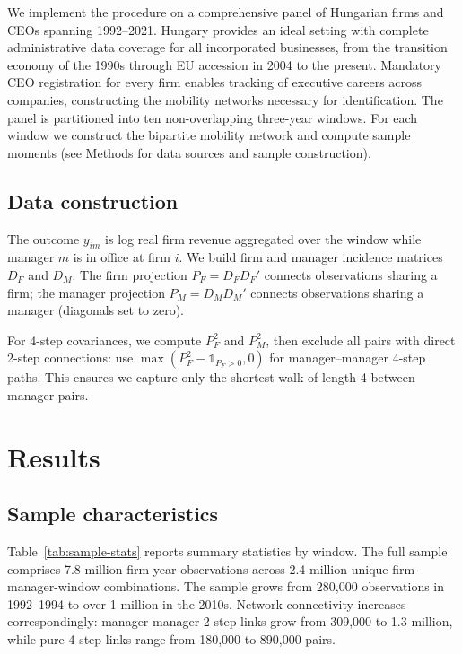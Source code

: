 \documentclass[9pt,twocolumn,twoside]{pnas-new}
\begin{document}
We implement the procedure on a comprehensive panel of Hungarian firms and CEOs spanning 1992--2021. Hungary provides an ideal setting with complete administrative data coverage for all incorporated businesses, from the transition economy of the 1990s through EU accession in 2004 to the present. Mandatory CEO registration for every firm enables tracking of executive careers across companies, constructing the mobility networks necessary for identification. The panel is partitioned into ten non-overlapping three-year windows. For each window we construct the bipartite mobility network and compute sample moments (see Methods for data sources and sample construction).

\subsection*{Data construction}
The outcome $y_{im}$ is log real firm revenue aggregated over the window while manager $m$ is in office at firm $i$. We build firm and manager incidence matrices $D_F$ and $D_M$. The firm projection $P_F = D_F D_F'$ connects observations sharing a firm; the manager projection $P_M = D_M D_M'$ connects observations sharing a manager (diagonals set to zero). 

For 4-step covariances, we compute $P_F^2$ and $P_M^2$, then exclude all pairs with direct 2-step connections: use $\max(P_F^2 - \mathbb{1}_{P_F>0}, 0)$ for manager--manager 4-step paths. This ensures we capture only the shortest walk of length 4 between manager pairs.

\section*{Results}

\subsection*{Sample characteristics}
Table~\ref{tab:sample-stats} reports summary statistics by window. The full sample comprises 7.8 million firm-year observations across 2.4 million unique firm-manager-window combinations. The sample grows from 280,000 observations in 1992--1994 to over 1 million in the 2010s. Network connectivity increases correspondingly: manager-manager 2-step links grow from 309,000 to 1.3 million, while pure 4-step links range from 180,000 to 890,000 pairs.
\end{document}
